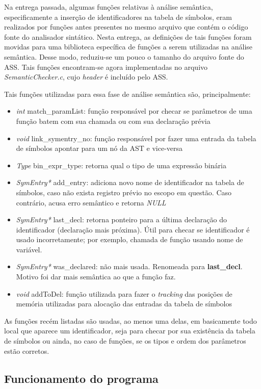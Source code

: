 \documentclass[
	article,			%
	11pt,				%
	oneside,			%
	a4paper,			%
	english,			%
	brazil,				%
	sumario=tradicional
	]{abntex2}
\renewcommand{\it}[1]{\textit{#1}}
\renewcommand{\bf}[1]{\textbf{#1}}
\begin{document}
Na entrega passada, algumas funções relativas à análise semântica, especificamente a inserção de identificadores na tabela de símbolos, eram realizados por funções antes presentes no mesmo arquivo que contém o código fonte do analisador sintático. Nesta entrega, as definições de tais funções foram movidas para uma biblioteca específica de funções a serem utilizadas na análise semântica. Desse modo, reduziu-se um pouco o tamanho do arquivo fonte do ASS. Tais funções encontram-se agora implementadas no arquivo \it{SemanticChecker.c}, cujo \it{header} é incluído pelo ASS.

Tais funções utilizadas para essa fase de análise semântica são, principalmente:

\begin{itemize}
	\item \it{int} match\_paramList: função responsável por checar se parâmetros de uma função batem com sua chamada ou com sua declaração prévia
	\item \it{void} link\_symentry\_no: função responsável por fazer uma entrada da tabela de símbolos apontar para um nó da AST e vice-versa
	\item \it{Type} bin\_expr\_type: retorna qual o tipo de uma expressão binária
	\item \it{SymEntry*} add\_entry: adiciona novo nome de identificador na tabela de símbolos, caso não exista registro prévio no escopo em questão. Caso contrário, acusa erro semântico e retorna \it{NULL}
	\item \it{SymEntry*} last\_decl: retorna ponteiro para a última declaração do identificador (declaração mais próxima). Útil para checar se identificador é usado incorretamente; por exemplo, chamada de função usando nome de variável.
  \item	\it{SymEntry*} was\_declared: não mais usada. Renomeada para \bf{last\_decl}. Motivo foi dar mais semântica ao que a função faz.
	\item \it{void} addToDel: função utilizada para fazer o \it{tracking} das posições de memória utilizadas para alocação das entradas da tabela de símbolos
\end{itemize}

As funções recém listadas são usadas, ao menos uma delas, em basicamente todo local que aparece um identificador, seja para checar por sua existência da tabela de símbolos ou ainda, no caso de funções, se os tipos e ordem dos parâmetros estão corretos.

\subsection{Funcionamento do programa}
\end{document}
